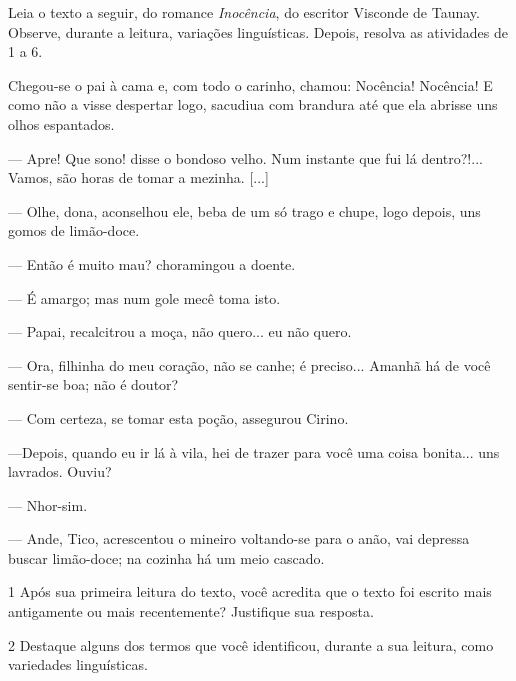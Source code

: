 Leia o texto a seguir, do romance \emph{Inocência}, do escritor Visconde
de Taunay. Observe, durante a leitura, variações linguísticas. Depois, resolva as atividades de 1 a 6.

\begin{myquote}
Chegou-se o pai à cama e, com todo o carinho, chamou: Nocência!
Nocência! E como não a visse despertar logo, sacudiua com brandura até
que ela abrisse uns olhos espantados.

— Apre! Que sono! disse o bondoso velho. Num instante que fui lá
dentro?!... Vamos, são horas de tomar a mezinha. {[}...{]}

— Olhe, dona, aconselhou ele, beba de um só trago e chupe, logo
depois, uns gomos de limão-doce.

— Então é muito mau? choramingou a doente.

— É amargo; mas num gole mecê toma isto.

— Papai, recalcitrou a moça, não quero... eu não quero.

— Ora, filhinha do meu coração, não se canhe; é preciso... Amanhã há
de você sentir-se boa; não é doutor?

— Com certeza, se tomar esta poção, assegurou Cirino.

—Depois, quando eu ir lá à vila, hei de trazer para você uma coisa
bonita... uns lavrados. Ouviu?

— Nhor-sim.

— Ande, Tico, acrescentou o mineiro voltando-se para o anão, vai
depressa buscar limão-doce; na cozinha há um meio cascado.

\end{myquote}

\num{1} Após sua primeira leitura do texto, você acredita que o texto foi escrito
mais antigamente ou mais recentemente? Justifique sua resposta.


\num{2} Destaque alguns dos termos que você identificou, durante a sua
leitura, como variedades linguísticas.



